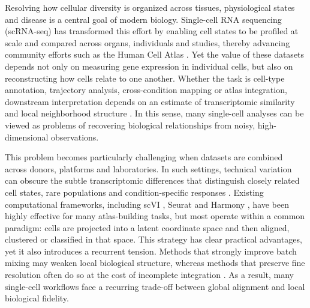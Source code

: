 \documentclass[11pt]{article}
\begin{document}
Resolving how cellular diversity is organized across tissues, physiological states and disease is a central goal of modern biology. Single-cell RNA sequencing (scRNA-seq) has transformed this effort by enabling cell states to be profiled at scale and compared across organs, individuals and studies, thereby advancing community efforts such as the Human Cell Atlas \cite{Regev2017HCA}. Yet the value of these datasets depends not only on measuring gene expression in individual cells, but also on reconstructing how cells relate to one another. Whether the task is cell-type annotation, trajectory analysis, cross-condition mapping or atlas integration, downstream interpretation depends on an estimate of transcriptomic similarity and local neighborhood structure \cite{Luecken2019BestPractices}. In this sense, many single-cell analyses can be viewed as problems of recovering biological relationships from noisy, high-dimensional observations.

This problem becomes particularly challenging when datasets are combined across donors, platforms and laboratories. In such settings, technical variation can obscure the subtle transcriptomic differences that distinguish closely related cell states, rare populations and condition-specific responses \cite{Korsunsky2019Harmony,Luecken2022BenchmarkingIntegration}. Existing computational frameworks, including scVI \cite{Lopez2018scVI}, Seurat \cite{Stuart2019Seurat,Hao2021Multimodal} and Harmony \cite{Korsunsky2019Harmony}, have been highly effective for many atlas-building tasks, but most operate within a common paradigm: cells are projected into a latent coordinate space and then aligned, clustered or classified in that space. This strategy has clear practical advantages, yet it also introduces a recurrent tension. Methods that strongly improve batch mixing may weaken local biological structure, whereas methods that preserve fine resolution often do so at the cost of incomplete integration \cite{Korsunsky2019Harmony,Luecken2022BenchmarkingIntegration}. As a result, many single-cell workflows face a recurring trade-off between global alignment and local biological fidelity.
\end{document}
